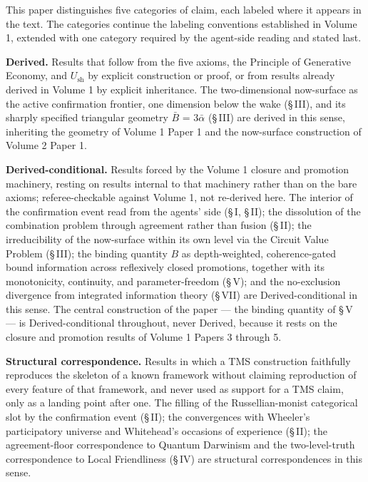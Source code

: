 \documentclass[11pt,oneside]{report}
\theoremstyle{definition}
\theoremstyle{remark}
\begin{document}
This paper distinguishes five categories of claim, each labeled where it
appears in the text. The categories continue the labeling conventions
established in Volume 1, extended with one category required by the
agent-side reading and stated last.

\textbf{Derived.} Results that follow from the five axioms, the
Principle of Generative Economy, and \ensuremath{U_{\mathrm{sh}}} by explicit
construction or proof, or from results already derived in Volume 1 by
explicit inheritance. The two-dimensional now-surface as the active
confirmation frontier, one dimension below the wake (\S\,III), and its
sharply specified triangular geometry \ensuremath{\bar{B}} = \ensuremath{3\bar{\alpha}} (\S\,III)
are derived in this sense, inheriting the geometry of Volume 1 Paper 1
and the now-surface construction of Volume 2 Paper 1.

\textbf{Derived-conditional.} Results forced by the Volume 1 closure and
promotion machinery, resting on results internal to that machinery
rather than on the bare axioms; referee-checkable against Volume 1, not
re-derived here. The interior of the confirmation event read from the
agents' side (\S\,I, \S\,II); the dissolution of the combination problem
through agreement rather than fusion (\S\,II); the irreducibility of the
now-surface within its own level via the Circuit Value Problem (\S\,III);
the binding quantity \ensuremath{B} as depth-weighted, coherence-gated bound
information across reflexively closed promotions, together with its
monotonicity, continuity, and parameter-freedom (\S\,V); and the
no-exclusion divergence from integrated information theory (\S\,VII) are
Derived-conditional in this sense. The central construction of the paper
--- the binding quantity of \S\,V --- is Derived-conditional throughout,
never Derived, because it rests on the closure and promotion results of
Volume 1 Papers 3 through 5.

\textbf{Structural correspondence.} Results in which a TMS construction
faithfully reproduces the skeleton of a known framework without claiming
reproduction of every feature of that framework, and never used as
support for a TMS claim, only as a landing point after one. The filling
of the Russellian-monist categorical slot by the confirmation event
(\S\,II); the convergences with Wheeler's participatory universe and
Whitehead's occasions of experience (\S\,II); the agreement-floor
correspondence to Quantum Darwinism and the two-level-truth
correspondence to Local Friendliness (\S\,IV) are structural
correspondences in this sense.
\end{document}
